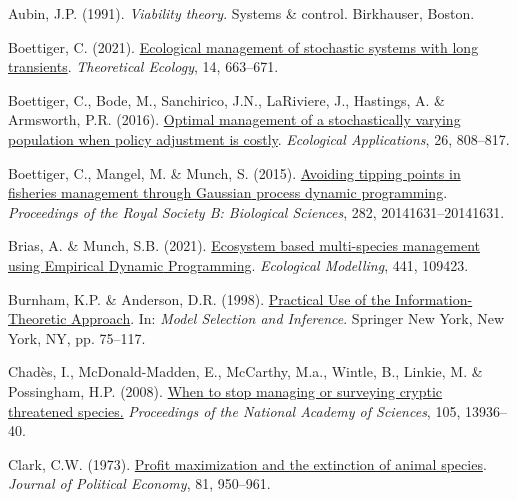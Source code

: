 \documentclass[3p]{elsarticle} %
\newlength{\cslhangindent}
\newenvironment{CSLReferences}[2] %
 {%
  \setlength{\parindent}{0pt}
  \ifodd #1 \everypar{\setlength{\hangindent}{\cslhangindent}}\ignorespaces\fi
  \ifnum #2 > 0
  \setlength{\parskip}{#2\baselineskip}
  \fi
 }%
 {}
\begin{document}
\hypertarget{refs}{}
\begin{CSLReferences}{1}{0}
\leavevmode{}%
Aubin, J.P. (1991). \emph{Viability theory}. Systems \& control.
Birkhauser, Boston.

\leavevmode{}%
Boettiger, C. (2021).
\href{https://doi.org/10.1007/s12080-020-00477-4}{Ecological management
of stochastic systems with long transients}. \emph{Theoretical Ecology},
14, 663--671.

\leavevmode{}%
Boettiger, C., Bode, M., Sanchirico, J.N., LaRiviere, J., Hastings, A.
\& Armsworth, P.R. (2016).
\href{https://doi.org/10.1890/15-0236}{Optimal management of a
stochastically varying population when policy adjustment is costly}.
\emph{Ecological Applications}, 26, 808--817.

\leavevmode{}%
Boettiger, C., Mangel, M. \& Munch, S. (2015).
\href{https://doi.org/10.1098/rspb.2014.1631}{Avoiding tipping points in
fisheries management through {Gaussian} process dynamic programming}.
\emph{Proceedings of the Royal Society B: Biological Sciences}, 282,
20141631--20141631.

\leavevmode{}%
Brias, A. \& Munch, S.B. (2021).
\href{https://doi.org/10.1016/j.ecolmodel.2020.109423}{Ecosystem based
multi-species management using {Empirical} {Dynamic} {Programming}}.
\emph{Ecological Modelling}, 441, 109423.

\leavevmode{}%
Burnham, K.P. \& Anderson, D.R. (1998).
\href{https://doi.org/10.1007/978-1-4757-2917-7_3}{Practical {Use} of
the {Information}-{Theoretic} {Approach}}. In: \emph{Model {Selection}
and {Inference}}. Springer New York, New York, NY, pp. 75--117.

\leavevmode{}%
Chadès, I., McDonald-Madden, E., McCarthy, M.a., Wintle, B., Linkie, M.
\& Possingham, H.P. (2008).
\href{https://doi.org/10.1073/pnas.0805265105}{When to stop managing or
surveying cryptic threatened species.} \emph{Proceedings of the National
Academy of Sciences}, 105, 13936--40.

\leavevmode{}%
Clark, C.W. (1973). \href{https://doi.org/10.1086/260090}{Profit
maximization and the extinction of animal species}. \emph{Journal of
Political Economy}, 81, 950--961.


\end{CSLReferences}
\end{document}
